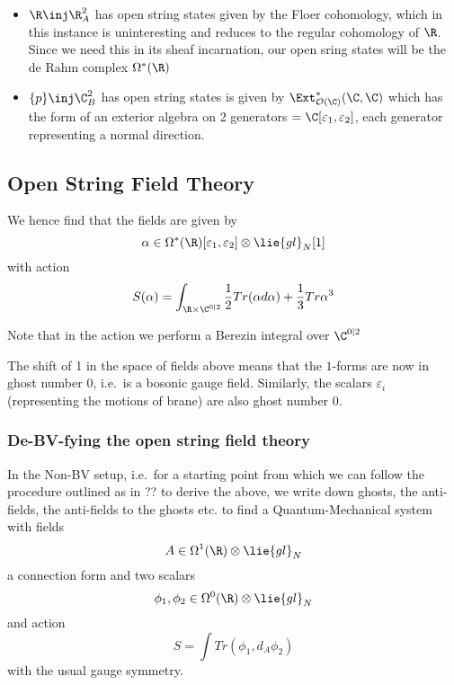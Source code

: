 \documentclass[12pt]{amsart}
\begin{document}
  \begin{itemize}
    \item $\R \inj \R^2_A$ has open string states given by the Floer
      cohomology, which in this instance is uninteresting and reduces to the
      regular cohomology of $\R$. Since we need this in its sheaf incarnation,
      our open sring states will be the de Rahm complex $\Omega^*(\R)$
    \item $\{p\} \inj \C^2_B$ has open string states is given by
      $\Ext^*_{\mc{O}(\C)}(\C,\C)$ which has the form of an exterior algebra on
      2 generators $ = \C[\varepsilon_1,\varepsilon_2]$, each generator
      representing a normal direction.
  \end{itemize}

\subsection{Open String Field Theory}

We hence find that the fields\footnotemark{} are given by
$$\alpha \in \Omega^*(\R)[\varepsilon_1,\varepsilon_2] \otimes
\lie{gl}_N[1]$$ with action $$S(\alpha) = \int_{\R \times
\C^{0|2}}\frac{1}{2}Tr(\alpha d\alpha) + \frac{1}{3} Tr \alpha^3$$

\begin{rmk}
  Note that in the action we perform a Berezin integral over $\C^{0|2}$
\end{rmk}
\begin{rmk}
  The shift of 1 in the space of fields above means that the $1$-forms are
  now in ghost number 0, i.e.\ is a bosonic gauge field. Similarly, the
  scalars $\varepsilon_i$ (representing the motions of brane) are also ghost
  number 0.
\end{rmk}

\subsubsection{De-BV-fying the open string field theory}
  In the Non-BV setup, i.e.\ for a starting point from which we can follow
  the procedure outlined as in ?? to derive the above, we write down ghosts,
  the anti-fields, the anti-fields to the ghosts etc. to find a Quantum-Mechanical system with fields
  $$A \in \Omega^1(\R)\otimes \lie{gl}_N$$ a connection form and two scalars
  $$\phi_1,\phi_2 \in \Omega^0(\R)\otimes\lie{gl}_N$$ and action $$S = \int
  Tr(\phi_1, d_A\phi_2)$$ with the usual gauge symmetry.
\end{document}
